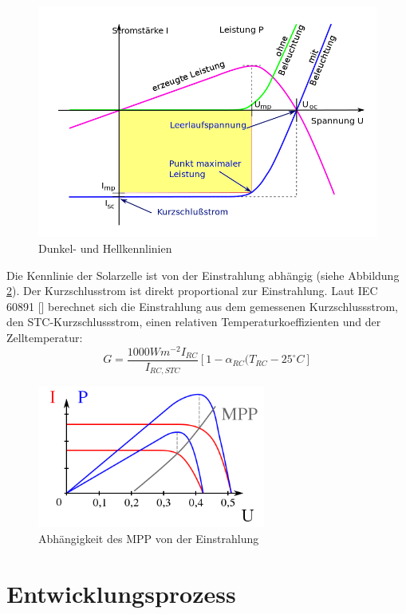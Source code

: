 \documentclass[a4paper,bibtotoc,oneside]{scrbook}
\begin{document}
\begin{figure}[htbp]
\centering
\includegraphics[width=125mm]{img/kennlinie.png}
\caption{Dunkel- und Hellkennlinien}\label{kennlinie}
\end{figure}

Die Kennlinie der Solarzelle ist von der Einstrahlung abhängig (siehe Abbildung \ref{mpp}). Der Kurzschlusstrom ist direkt proportional zur Einstrahlung.
Laut IEC 60891 [\cite{norm891}] berechnet sich die Einstrahlung aus dem gemessenen Kurzschlussstrom, den STC-Kurzschlussstrom, einen relativen Temperaturkoeffizienten und der Zelltemperatur:
\begin{equation}
G = \frac{1000Wm^{-2}I_{RC}}{I_{RC,STC}} [1 - \alpha_{RC}(T_{RC}-25^{\circ} C]
\end{equation}
\begin{figure}[htbp]
\centering
\includegraphics[width=75mm]{img/mpp.png}
\caption{Abhängigkeit des MPP von der Einstrahlung}\label{mpp}
\end{figure}

\chapter{Entwicklungsprozess}\thispagestyle{empty}
\end{document}
